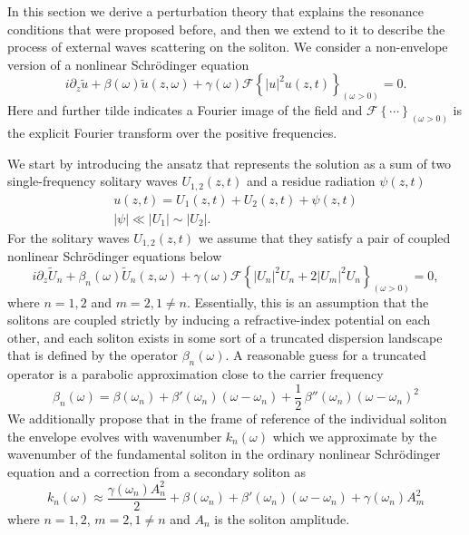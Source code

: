 \documentclass[aps, prl, twocolumn, superscriptaddress, final]{revtex4}
\newcommand{\abs}[1]{\left| #1 \right|}
\begin{document}
In this section we derive a perturbation theory that explains the resonance conditions that were proposed before, and then we extend to it to describe the process of external waves scattering on the soliton. We consider a non-envelope version of a nonlinear Schr\"odinger equation~\cite{amiranashvili2010hamiltonian}
\begin{equation}
  \label{eq:GNLSE}
  i \partial_{z} \tilde u
    + \beta(\omega) \tilde u(z, \omega)
    + \gamma(\omega) \mathcal{F} \left\{
      \abs{u}^{2} u(z, t)
    \right\}_{(\omega > 0)} = 0.
\end{equation}
Here and further tilde indicates a Fourier image of the field and $\mathcal{F}\left\{ \cdots \right\}_{(\omega > 0)}$ is the explicit Fourier transform over the positive frequencies.

\begin{widetext}

\noindent We start by introducing the ansatz that represents the solution as a sum of two single-frequency solitary waves $U_{1, 2}(z, t)$ and a residue radiation $\psi(z, t)$
\begin{gather}
  \label{eq:PerturbationAnsatz}
  u(z, t) = U_{1}(z, t) + U_{2}(z, t) + \psi(z, t) \\
  \abs{\psi} \ll \abs{U_{1}} \sim \abs{U_{2}}. \nonumber
\end{gather}
For the solitary waves $U_{1, 2}(z, t)$ we assume that they satisfy a pair of coupled nonlinear Schr\"odinger equations below
\begin{equation}
  \label{eq:CoupledSolitons}
  i \partial_{z} \tilde U_{n}
    + \beta_{n}(\omega) \tilde U_{n}(z, \omega)
    + \gamma(\omega) \mathcal{F} \left\{
      \abs{U_{n}}^{2} U_{n} + 2 \abs{U_{m}}^{2} U_{n}
    \right\}_{(\omega > 0)} = 0,
\end{equation}
where $n = 1, 2$ and $m = 2, 1 \ne n$. Essentially, this is an assumption that the solitons are coupled strictly by inducing a refractive-index potential on each other, and each soliton exists in some sort of a truncated dispersion landscape that is defined by the operator $\beta_{n}(\omega)$. A reasonable guess for a truncated operator is a parabolic approximation close to the carrier frequency
\begin{equation}
  \label{eq:TruncatedDispersionOperator}
  \beta_{n}(\omega) =
    \beta(\omega_{n}) +
    \beta'(\omega_{n}) (\omega - \omega_{n}) +
    \frac{1}{2} \, \beta''(\omega_{n}) (\omega - \omega_{n})^{2}
\end{equation}
We additionally propose that in the frame of reference of the individual soliton the envelope evolves with wavenumber $k_{n}(\omega)$ which we approximate by the wavenumber of the fundamental soliton in the ordinary nonlinear Schr\"odinger equation and a correction from a secondary soliton as
\begin{equation}
  \label{eq:SolitonWavenumber}
  k_{n}(\omega)
    \approx \frac{\gamma(\omega_{n}) A_{n}^{2}}{2}
    + \beta(\omega_{n}) + \beta'(\omega_{n}) (\omega - \omega_{n})
    + \gamma(\omega_{n}) A_{m}^{2}
\end{equation}
where $n = 1, 2$, $m = 2, 1 \ne n$ and $A_{n}$ is the soliton amplitude.


\end{widetext}
\end{document}
